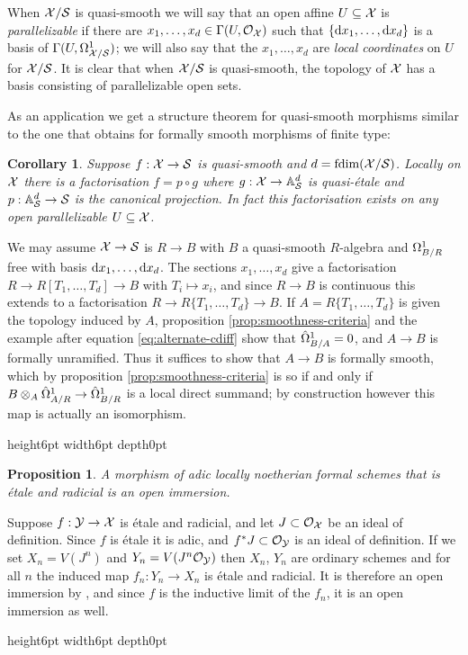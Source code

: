 \documentclass{article}
\theoremstyle{change}
\newtheorem{prop}[subsubsection]{Proposition}
\newtheorem{cor}[subsubsection]{Corollary}
\numberwithin{equation}{subsubsection}
\newcommand{\demobox}{\vrule height6pt width6pt depth0pt}
\newenvironment{demo}{\noindent{\it Proof.}}
{{\unskip\nobreak\hfil\qquad
\demobox\parfillskip=0pt\par}
\medskip}
\begin{document}
When ${\cal X}/{\cal S}$ is quasi-smooth we will say that an open affine $U\subseteq{\cal X}$
is \textit{parallelizable} if there are
$x_1,\ldots,x_d\in\Gamma(U,{\cal O}_{\cal X})$ such that
$\{\mathrm{d} x_1,\ldots,\mathrm{d} x_d\}$ is a basis of
$\Gamma(U,\Omega^1_{{\cal X}/{\cal S}})$; we will also say that the
$x_1,\ldots,x_d$ are \textit{local coordinates} on $U$ for
${\cal X}/{\cal S}$. It is clear that when ${\cal X}/{\cal S}$ is quasi-smooth, the topology of
${\cal X}$ has a basis consisting of parallelizable open sets.

As an application we get a structure theorem for quasi-smooth morphisms
similar to the one that obtains for formally smooth morphisms of
finite type:

\begin{cor}\label{cor:structure-of-smooth-morphisms}
  Suppose $f:{\cal X}\to{\cal S}$ is quasi-smooth and $d=\mathop{\textrm{fdim}({{\cal X}/{\cal S}})}$. Locally on
  ${\cal X}$ there is a factorisation $f=p\circ g$ where
  $g:{\cal X}\to{\mathbb{A}}^d_{\cal S}$ is quasi-\'etale and $p:{\mathbb{A}}^d_{\cal S}\to{\cal S}$ is the
  canonical projection. In fact this factorisation exists on any open
  parallelizable $U\subseteq{\cal X}$.
\end{cor}
\begin{demo}
  We may assume ${\cal X}\to{\cal S}$ is $R\to B$ with $B$ a quasi-smooth
  $R$-algebra and $\Omega^1_{B/R}$ free with basis
  $\mathrm{d} x_1,\ldots,\mathrm{d} x_d$. The sections $x_1,\ldots,x_d$ give a
  factorisation $R\to R[T_1,\ldots,T_d]\to B$ with $T_i\mapsto x_i$,
  and since $R\to B$ is continuous this extends to a factorisation
  $R\to R\{T_1,\ldots,T_d\}\to B$. If $A=R\{T_1,\ldots,T_d\}$ is given
  the topology induced by $A$, proposition
  \ref{prop:smoothness-criteria} and the example after equation
  \ref{eq:alternate-cdiff} show that $\hat\Omega^1_{B/A}=0$, and $A\to B$ is
  formally unramified. Thus it suffices to show that $A\to B$ is
  formally smooth, which by proposition \ref{prop:smoothness-criteria}
  is so if and only if $B\otimes_A\hat\Omega^1_{A/R}\to\hat\Omega^1_{B/R}$ is a
  local direct summand; by construction however this map is actually
  an isomorphism.
\end{demo}

\begin{prop}\label{prop:etale-and-radicial}
  A morphism of adic locally noetherian formal schemes that is \'etale
  and radicial is an open immersion.
\end{prop}
\begin{demo}
  Suppose $f:{\cal Y}\to{\cal X}$ is \'etale and radicial, and let
  $J\subset{\cal O}_{\cal X}$ be an ideal of definition. Since $f$ is \'etale it
  is adic, and $f^*J\subset{\cal O}_{\cal Y}$ is an ideal of definition. If we
  set $X_n=V(J^n)$ and $Y_n=V(J^n{\cal O}_{\cal Y})$ then $X_n$, $Y_n$ are
  ordinary schemes and for all $n$ the induced map $f_n:Y_n\to X_n$ is
  \'etale and radicial. It is therefore an open immersion by \cite[IV
  Th. 17.9.1]{EGA}, and since $f$ is the inductive limit of the $f_n$,
  it is an open immersion as well.
\end{demo}
\end{document}
